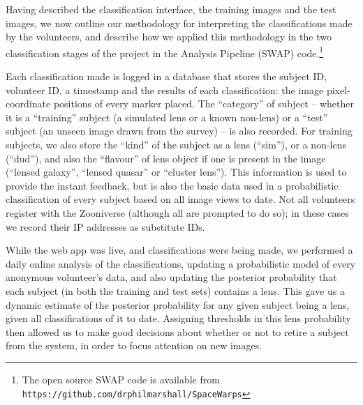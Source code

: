 \documentclass[useAMS,usenatbib,a4paper]{mn2e}
\begin{document}
Having described the classification interface, the training images and the
test images,  we now outline our methodology for interpreting the
classifications made by the
volunteers, and describe how we
applied this methodology in the two classification stages of the \cfhtls
project in the \SW Analysis Pipeline (SWAP) code.\footnote{The open source
SWAP code is available from
\texttt{https://github.com/drphilmarshall/SpaceWarps}}

Each classification made is logged in a database that stores the subject ID,
volunteer ID, a timestamp and the results of each classification: the image
pixel-coordinate positions of every marker placed.  The ``category'' of subject --
whether it is a ``training'' subject (a simulated lens or a known non-lens) or a
``test'' subject (an unseen image drawn from the survey) -- is also recorded.
For training subjects, we also store the ``kind'' of the subject as
a lens (``sim''), or a non-lens (``dud''), and also the ``flavour'' of lens
object if one is present in the image (``lensed galaxy'', ``lensed quasar'' or
``cluster lens'').  This information is used to provide the instant feedback, but
is also the basic data used in a probabilistic classification of every
subject based on all image views to date. Not all
volunteers register with the Zooniverse (although all are prompted to do so);
in these cases we record their IP addresses as substitute IDs.

While the \SW web app was live, and classifications were being made, we
performed a daily online analysis of the classifications,
updating a probabilistic model of every
anonymous volunteer's data, and also updating the posterior probability that
each subject (in both the training and test sets) contains a lens.
This gave us a dynamic estimate of the posterior probability for  any
given  subject being a lens, given all classifications of it to date. Assigning
thresholds in this lens probability then allowed us to make good decisions about
whether or not to retire a subject from the system, in order to focus attention
on new images.
\end{document}
